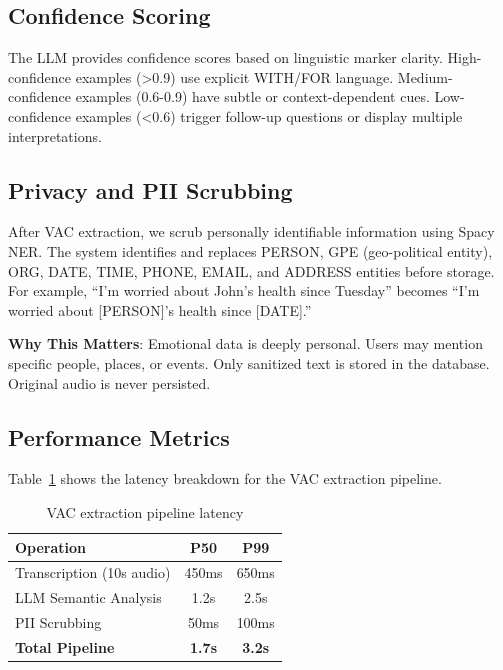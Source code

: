 \subsection{Confidence Scoring}

The LLM provides confidence scores based on linguistic marker clarity. High-confidence examples (>0.9) use explicit WITH/FOR language. Medium-confidence examples (0.6-0.9) have subtle or context-dependent cues. Low-confidence examples (<0.6) trigger follow-up questions or display multiple interpretations.

\subsection{Privacy and PII Scrubbing}

After VAC extraction, we scrub personally identifiable information using Spacy NER. The system identifies and replaces PERSON, GPE (geo-political entity), ORG, DATE, TIME, PHONE, EMAIL, and ADDRESS entities before storage. For example, ``I'm worried about John's health since Tuesday'' becomes ``I'm worried about [PERSON]'s health since [DATE].''

\textbf{Why This Matters}: Emotional data is deeply personal. Users may mention specific people, places, or events. Only sanitized text is stored in the database. Original audio is never persisted.

\subsection{Performance Metrics}

Table~\ref{tab:extraction-latency} shows the latency breakdown for the VAC extraction pipeline.

\begin{table}[h]
\centering
\caption{VAC extraction pipeline latency}
\label{tab:extraction-latency}
\begin{tabular}{lcc}
\toprule
\textbf{Operation} & \textbf{P50} & \textbf{P99} \\
\midrule
Transcription (10s audio) & 450ms & 650ms \\
LLM Semantic Analysis & 1.2s & 2.5s \\
PII Scrubbing & 50ms & 100ms \\
\textbf{Total Pipeline} & \textbf{1.7s} & \textbf{3.2s} \\
\bottomrule
\end{tabular}
\end{table}

